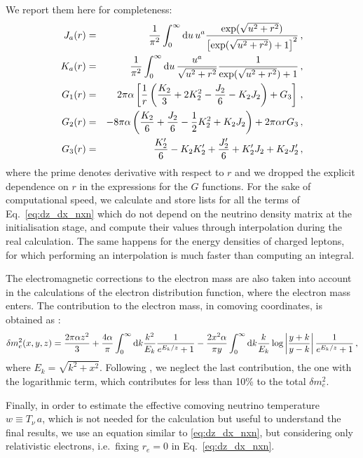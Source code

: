 \documentclass[notitlepage,showpacs,preprintnumbers,amsmath,amssymb,superscriptaddress,prd,onecolumn]{revtex4-1}
\begin{document}
We report them here for completeness:
%
\begin{eqnarray}
J_a(r)
&=&
\frac{1}{\pi^2}
\int_0^\infty {\rm d}u \, u^a
\frac{\exp(\sqrt{u^2+r^2})}{\left[\exp(\sqrt{u^2+r^2})+1\right]^2}
\label{eq:j}
\,,\\
K_a(r)
&=&
\frac{1}{\pi^2}
\int_0^\infty {\rm d}u \, 
\frac{u^a}{\sqrt{u^2+r^2}}
\frac{1}{\exp(\sqrt{u^2+r^2})+1}
\label{eq:k}
\,,\\
G_1(r)
&=&
2\pi\alpha
\left[
  \frac{1}{r}
  \left(
    \frac{K_2}{3}
    + 2 K_2^2
    -\frac{J_2}{6}
    -K_2J_2
  \right)
  +
  G_3
\right]
\label{eq:g1}
\,,\\
G_2(r)
&=&
-8\pi\alpha
\left(
  \frac{K_2}{6}
  +\frac{J_2}{6}
  -\frac{1}{2}K_2^2
  +K_2J_2
\right)
+
2\pi\alpha r
G_3
\label{eq:g2}
\,,\\
G_3(r)
&=&
\frac{K_2'}{6}
-K_2K_2'
+\frac{J_2'}{6}
+K_2'J_2
+K_2J_2'
\,,
\label{eq:g3}
\end{eqnarray}
%
where the prime denotes derivative with respect to $r$ and we dropped the explicit dependence on $r$ in the expressions for the $G$ functions.
For the sake of computational speed, we calculate and store lists for all the terms of Eq.~\eqref{eq:dz_dx_nxn}
which do not depend on the neutrino density matrix 
at the initialisation stage, and compute their values through interpolation during the real calculation.
The same happens for the energy densities of charged leptons, for which performing an interpolation
is much faster than computing an integral.

The electromagnetic corrections to the electron mass are also taken into account in the calculations
of the electron distribution function, where the electron mass enters.
The contribution to the electron mass, in comoving coordinates, is obtained as \cite{Mangano:2001iu}:
\begin{equation}
\delta m_e^2(x, y, z)
=
\frac{2\pi\alpha z^2}{3}
+
\frac{4\alpha}{\pi}
\int_0^\infty{\rm d}k
\frac{k^2}{E_k}
\frac{1}{e^{E_k/z}+1}
-
\frac{2x^2\alpha}{\pi y}
\int_0^\infty{\rm d}k
\frac{k}{E_k}
\log\left|\frac{y+k}{y-k}\right|
\frac{1}{e^{E_k/z}+1}
\,,
\end{equation}
where $E_k=\sqrt{k^2+x^2}$.
Following \cite{Mangano:2001iu}, we neglect the last contribution, the one with the logarithmic term,
which contributes for less than 10\% to the total $\delta m_e^2$.

Finally, in order to estimate the effective comoving neutrino temperature $w\equiv T_\nu\,a$, which is
not needed for the calculation but useful to understand the final results,
we use an equation similar to \eqref{eq:dz_dx_nxn},
but considering only relativistic electrons, i.e.\ fixing $r_e=0$ in Eq.~\eqref{eq:dz_dx_nxn}.
\end{document}

